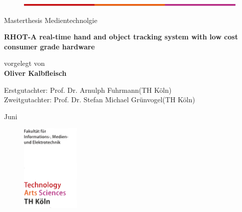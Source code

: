 \begin{titlepage}

\begin{center}
\begin{figure}[!ht]
	\centering
		\includegraphics[width=\textwidth]{images/Th_color_bar.png}
\end{figure}
\end{center}
\begin{flushleft}
\begin{normalsize}
Masterthesis Medientechnolgie\\
\end{normalsize}
\vspace{0.5cm}
\begin{huge}
\textbf{RHOT-A real-time hand and object tracking system with low cost consumer grade hardware}
\end{huge}
\end{flushleft}
\vspace{1.0cm}
\begin{flushleft}
\begin{small}
vorgelegt von\\ 
\vspace{0.3cm}
\textbf{Oliver Kalbfleisch} \\
\end{small}
\end{flushleft}
\vspace{2.0cm}
\begin{flushleft}
\begin{small}
Erstgutachter: Prof. Dr. Arnulph Fuhrmann(TH Köln) \\[1.0em]
Zweitgutachter: Prof. Dr. Stefan Michael Grünvogel(TH Köln)
\end{small}
\end{flushleft}
\vspace{1.5cm}
\begin{flushleft}
\begin{small}
Juni \the\year
\end{small}
\end{flushleft}
\begin{figure}[!ht]
\begin{flushright}
\includegraphics[width=0.25\textwidth]{images/TH_bottom_logo.png}

\end{flushright}
\end{figure}
\end{titlepage}
